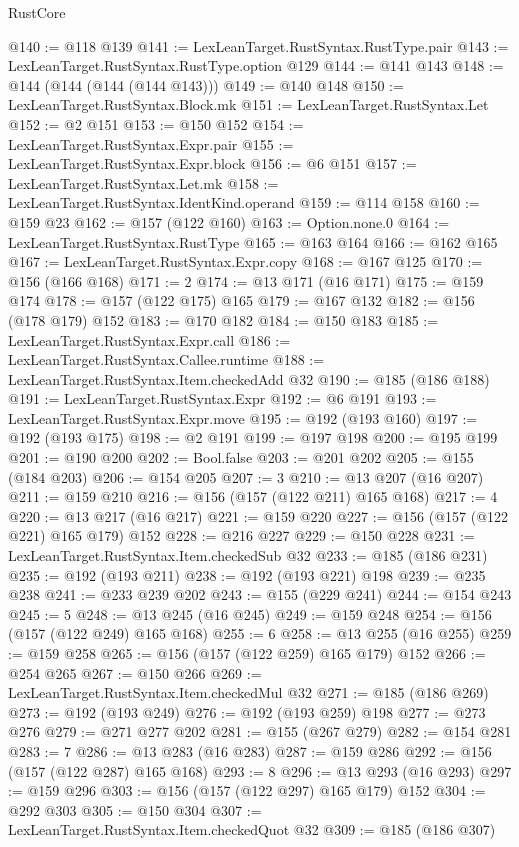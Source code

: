 \begin{lexlean}{RustCore}
\begin{coremodule}
@140 := @118 @139
@141 := LexLeanTarget.RustSyntax.RustType.pair
@143 := LexLeanTarget.RustSyntax.RustType.option @129
@144 := @141 @143
@148 := @144 (@144 (@144 (@144 @143)))
@149 := @140 @148
@150 := LexLeanTarget.RustSyntax.Block.mk
@151 := LexLeanTarget.RustSyntax.Let
@152 := @2 @151
@153 := @150 @152
@154 := LexLeanTarget.RustSyntax.Expr.pair
@155 := LexLeanTarget.RustSyntax.Expr.block
@156 := @6 @151
@157 := LexLeanTarget.RustSyntax.Let.mk
@158 := LexLeanTarget.RustSyntax.IdentKind.operand
@159 := @114 @158
@160 := @159 @23
@162 := @157 (@122 @160)
@163 := Option.none.{0}
@164 := LexLeanTarget.RustSyntax.RustType
@165 := @163 @164
@166 := @162 @165
@167 := LexLeanTarget.RustSyntax.Expr.copy
@168 := @167 @125
@170 := @156 (@166 @168)
@171 := 2
@174 := @13 @171 (@16 @171)
@175 := @159 @174
@178 := @157 (@122 @175) @165
@179 := @167 @132
@182 := @156 (@178 @179) @152
@183 := @170 @182
@184 := @150 @183
@185 := LexLeanTarget.RustSyntax.Expr.call
@186 := LexLeanTarget.RustSyntax.Callee.runtime
@188 := LexLeanTarget.RustSyntax.Item.checkedAdd @32
@190 := @185 (@186 @188)
@191 := LexLeanTarget.RustSyntax.Expr
@192 := @6 @191
@193 := LexLeanTarget.RustSyntax.Expr.move
@195 := @192 (@193 @160)
@197 := @192 (@193 @175)
@198 := @2 @191
@199 := @197 @198
@200 := @195 @199
@201 := @190 @200
@202 := Bool.false
@203 := @201 @202
@205 := @155 (@184 @203)
@206 := @154 @205
@207 := 3
@210 := @13 @207 (@16 @207)
@211 := @159 @210
@216 := @156 (@157 (@122 @211) @165 @168)
@217 := 4
@220 := @13 @217 (@16 @217)
@221 := @159 @220
@227 := @156 (@157 (@122 @221) @165 @179) @152
@228 := @216 @227
@229 := @150 @228
@231 := LexLeanTarget.RustSyntax.Item.checkedSub @32
@233 := @185 (@186 @231)
@235 := @192 (@193 @211)
@238 := @192 (@193 @221) @198
@239 := @235 @238
@241 := @233 @239 @202
@243 := @155 (@229 @241)
@244 := @154 @243
@245 := 5
@248 := @13 @245 (@16 @245)
@249 := @159 @248
@254 := @156 (@157 (@122 @249) @165 @168)
@255 := 6
@258 := @13 @255 (@16 @255)
@259 := @159 @258
@265 := @156 (@157 (@122 @259) @165 @179) @152
@266 := @254 @265
@267 := @150 @266
@269 := LexLeanTarget.RustSyntax.Item.checkedMul @32
@271 := @185 (@186 @269)
@273 := @192 (@193 @249)
@276 := @192 (@193 @259) @198
@277 := @273 @276
@279 := @271 @277 @202
@281 := @155 (@267 @279)
@282 := @154 @281
@283 := 7
@286 := @13 @283 (@16 @283)
@287 := @159 @286
@292 := @156 (@157 (@122 @287) @165 @168)
@293 := 8
@296 := @13 @293 (@16 @293)
@297 := @159 @296
@303 := @156 (@157 (@122 @297) @165 @179) @152
@304 := @292 @303
@305 := @150 @304
@307 := LexLeanTarget.RustSyntax.Item.checkedQuot @32
@309 := @185 (@186 @307)

\end{coremodule}
\end{lexlean}
